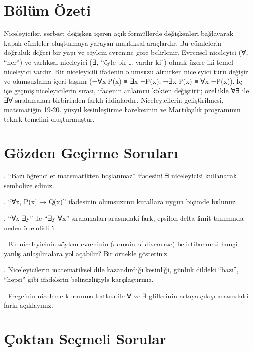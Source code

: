 \section*{Bölüm Özeti}

Niceleyiciler, serbest değişken içeren açık formüllerde değişkenleri bağlayarak kapalı cümleler oluşturmaya yarayan mantıksal araçlardır. Bu cümlelerin doğruluk değeri bir yapı ve söylem evrenine göre belirlenir. Evrensel niceleyici (∀, “her”) ve varlıksal niceleyici (∃, “öyle bir … vardır ki”) olmak üzere iki temel niceleyici vardır. Bir niceleyicili ifadenin olumsuzu alınırken niceleyici türü değişir ve olumsuzlama içeri taşınır (¬∀x P(x) ≡ ∃x ¬P(x); ¬∃x P(x) ≡ ∀x ¬P(x)). İç içe geçmiş niceleyicilerin sırası, ifadenin anlamını kökten değiştirir; özellikle ∀∃ ile ∃∀ sıralamaları birbirinden farklı iddialardır. Niceleyicilerin geliştirilmesi, matematiğin 19-20. yüzyıl kesinleştirme hareketinin ve Mantıkçılık programının teknik temelini oluşturmuştur.

\section*{Gözden Geçirme Soruları}

\par{}. “Bazı öğrenciler matematikten hoşlanmaz” ifadesini ∃ niceleyicisi kullanarak sembolize ediniz.

\par{}. “∀x, P(x) → Q(x)” ifadesinin olumsuzunu kurallara uygun biçimde bulunuz.

\par{}. “∀x ∃y” ile “∃y ∀x” sıralamaları arasındaki fark, epsilon-delta limit tanımında neden önemlidir?

\par{}. Bir niceleyicinin söylem evreninin (domain of discourse) belirtilmemesi hangi yanlış anlaşılmalara yol açabilir? Bir örnekle gösteriniz.

\par{}. Niceleyicilerin matematiksel dile kazandırdığı kesinliği, günlük dildeki “bazı”, “hepsi” gibi ifadelerin belirsizliğiyle karşılaştırınız.

\par{}. Frege’nin niceleme kuramına katkısı ile ∀ ve ∃ gliflerinin ortaya çıkışı arasındaki farkı açıklayınız.

\section*{Çoktan Seçmeli Sorular}

